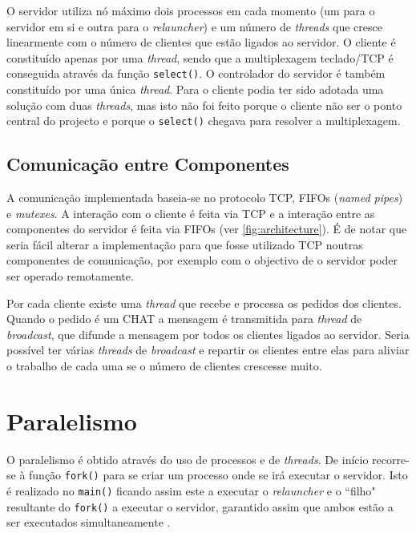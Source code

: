 \documentclass[a4paper]{article}
\begin{document}
	O servidor utiliza nó máximo dois processos em cada momento (um para o servidor em si e outra para o \textit{relauncher})  e um número de \textit{threads} que cresce linearmente com o número de clientes que estão ligados ao servidor. O cliente é constituído apenas por uma \textit{thread}, sendo que a multiplexagem teclado/TCP é conseguida através da função \texttt{select()}. O controlador do servidor é também constituído por uma única \textit{thread}. Para o cliente podia ter sido adotada uma solução com duas \textit{threads}, mas isto não foi feito porque o cliente não ser o ponto central do projecto e porque o \texttt{select()} chegava para resolver a multiplexagem.


	\subsection{Comunicação entre Componentes}

	A comunicação implementada baseia-se no protocolo TCP, FIFOs (\textit{named pipes}) e \textit{mutexes}. A interação com o cliente é feita via TCP e a interação entre as componentes do servidor é feita via FIFOs (ver \autoref{fig:architecture}). É de notar que seria fácil alterar a implementação para que fosse utilizado TCP noutras componentes de comunicação, por exemplo com o objectivo de o servidor poder ser operado remotamente. 

	Por cada cliente existe uma \textit{thread} que recebe e processa os pedidos dos clientes. Quando o pedido é um CHAT a mensagem é transmitida para \textit{thread} de \textit{broadcast}, que difunde a mensagem por todos os clientes ligados ao servidor. Seria possível ter várias \textit{threads} de \textit{broadcast} e repartir os clientes entre elas para aliviar o trabalho de cada uma se o número de clientes crescesse muito.



	\section{Paralelismo}

	O paralelismo é obtido através do uso de processos e de \textit{threads}. De início recorre-se à função \texttt{fork()} para se criar um processo onde se irá executar o servidor. Isto é realizado no \texttt{main()} ficando assim este a executar o \textit{relauncher} e o ``filho" resultante do \texttt{fork()} a executar o servidor, garantido assim que ambos estão a ser executados simultaneamente . 
\end{document}
